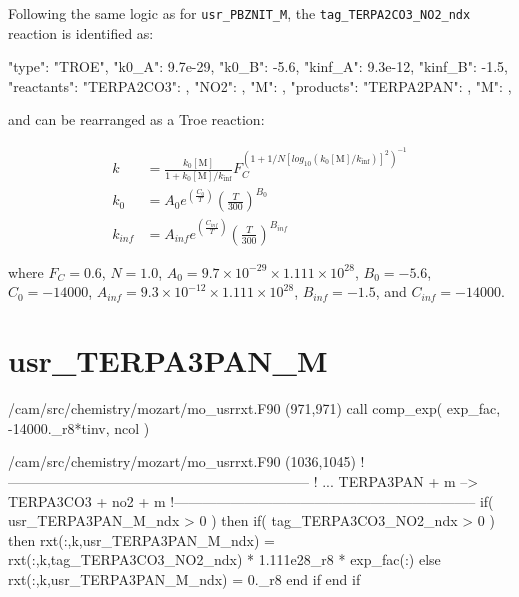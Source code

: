 \documentclass[titlepage]{article}
\begin{document}
Following the same logic as for \verb>usr_PBZNIT_M>, the \verb>tag_TERPA2CO3_NO2_ndx> reaction is identified as:

\begin{blockcode}
        {
          "type": "TROE",
          "k0_A": 9.7e-29,
          "k0_B": -5.6,
          "kinf_A": 9.3e-12,
          "kinf_B": -1.5,
          "reactants": {
            "TERPA2CO3": { },
            "NO2": { },
            "M": { }
          },
          "products": {
            "TERPA2PAN": { },
            "M": { }
          }
        },
\end{blockcode}

\noindent and can be rearranged as a Troe reaction:

\begin{equation}
\begin{split}
k & = \frac{k_0[\mbox{M}]}{1+k_0[\mbox{M}]/k_{\inf}}F_C^{(1+1/N[log_{10}(k_0[\mbox{M}]/k_{\inf})]^2)^{-1}} \\
k_0 & = A_0 e^{\left( \frac{C_0}{T} \right)} \left( \frac{T}{300} \right)^{B_0} \\
k_{inf} & = A_{inf} e^{\left( \frac{C_{inf}}{T} \right)} \left( \frac{T}{300} \right)^{B_{inf}}
\end{split}
\end{equation}

\noindent where $F_C = 0.6$, $N = 1.0$, $A_0 = 9.7 \times 10^{-29} \times 1.111 \times 10^{28}$, $B_0 = -5.6$, $C_0 = -14000$, $A_{inf} = 9.3 \times 10^{-12} \times 1.111 \times 10^{28}$, $B_{inf} = -1.5$, and $C_{inf} = -14000$.


\section{usr\_TERPA3PAN\_M}

\begin{blockcode}[commandchars=\\\{\}]
\color{gray}/cam/src/chemistry/mozart/mo_usrrxt.F90 (971,971)
       call comp_exp( exp_fac, -14000._r8*tinv, ncol )
\end{blockcode}

\begin{blockcode}[commandchars=\\\{\}]
\color{gray}/cam/src/chemistry/mozart/mo_usrrxt.F90 (1036,1045)
!-----------------------------------------------------------------
!       ... TERPA3PAN + m --> TERPA3CO3 + no2 + m
!-----------------------------------------------------------------
       if( usr_TERPA3PAN_M_ndx > 0 ) then
          if( tag_TERPA3CO3_NO2_ndx > 0 ) then
             rxt(:,k,usr_TERPA3PAN_M_ndx) = rxt(:,k,tag_TERPA3CO3_NO2_ndx) * 1.111e28_r8 * exp_fac(:)
          else
             rxt(:,k,usr_TERPA3PAN_M_ndx) = 0._r8
          end if
       end if
\end{blockcode}
\end{document}
